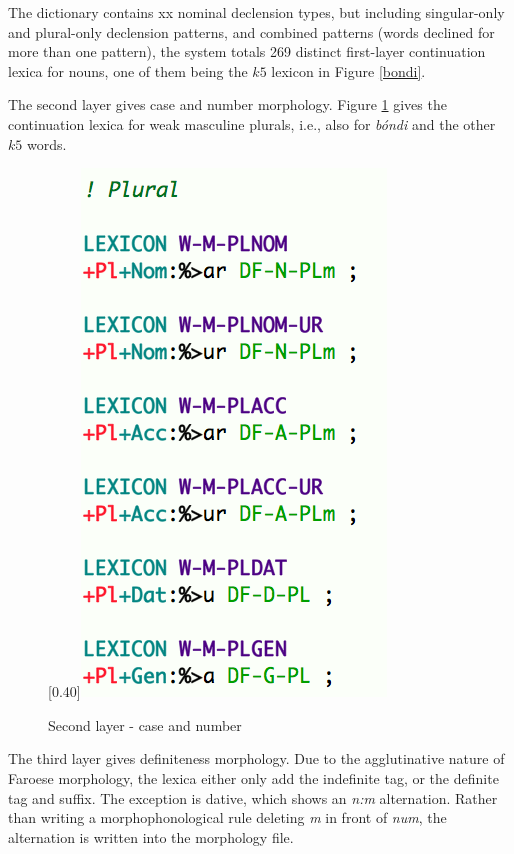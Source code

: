 \documentclass[11pt]{article}
\begin{document}
The dictionary contains xx nominal declension types, but including singular-only and plural-only declension patterns, and combined patterns (words declined for more than one pattern), the system totals 269 distinct first-layer continuation lexica for nouns, one of them being the $k5$ lexicon in Figure \ref{bondi}.

The second layer gives case and number morphology. Figure \ref{wmplnom} gives the continuation lexica for weak masculine plurals, i.e., also for \textit{bóndi} and the other $k5$ words.
 
\begin{figure}[hp]
\begin{center}
\scalebox{0.40}[0.40]{\includegraphics{img/wmplnom.png}}
\caption{Second layer - case and number}
\label{wmplnom}
\end{center}
\end{figure}

The third layer gives definiteness morphology. Due to the agglutinative nature of Faroese morphology, the lexica either only add the indefinite tag, or the definite tag and suffix. The exception is dative, which shows an \textit{n:m} alternation. Rather than writing a morphophonological rule deleting \textit{m} in front of \textit{num}, the alternation is written into the morphology file.
\end{document}
